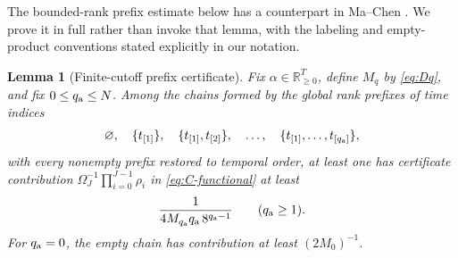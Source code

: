 \documentclass[11pt]{article}
\newtheorem{lemma}[theorem]{Lemma}
\theoremstyle{definition}
\theoremstyle{remark}
\newcommand{\R}{\mathbb{R}}
\newcommand{\rankmass}{M}
\begin{document}
The bounded-rank prefix estimate below has a counterpart in Ma--Chen
\cite[Lemma~B.1]{machen2026}.  We prove it in full rather than invoke that
lemma, with the labeling and empty-product conventions stated explicitly in
our notation.

\begin{lemma}[Finite-cutoff prefix certificate]
\label{lem:bounded-prefix}
Fix \(\alpha\in\R_{\ge0}^T\), define \(\rankmass_q\) by \eqref{eq:Dq},
and fix \(0\le q_{\rm a}\le N\).  Among the chains formed by the global
rank prefixes of time indices
\[
 \varnothing,\quad
 \{t_{[1]}\},\quad
 \{t_{[1]},t_{[2]}\},\quad\ldots,\quad
 \{t_{[1]},\ldots,t_{[q_{\rm a}]}\},
\]
with every nonempty prefix restored to temporal order, at least one has
certificate contribution
\(\Omega_J^{-1}\prod_{i=0}^{J-1}\rho_i\) in
\eqref{eq:C-functional} at least
\begin{equation}
 \frac1{4\rankmass_{q_{\rm a}}q_{\rm a}\,8^{q_{\rm a}-1}}
 \qquad(q_{\rm a}\ge1).
 \label{eq:prefix-bound}
\end{equation}
For \(q_{\rm a}=0\), the empty chain has contribution at least
\((2\rankmass_0)^{-1}\).
\end{lemma}
\end{document}
